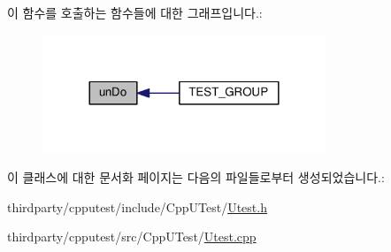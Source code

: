 이 함수를 호출하는 함수들에 대한 그래프입니다.\+:
\nopagebreak
\begin{figure}[H]
\begin{center}
\leavevmode
\includegraphics[width=240pt]{class_test_installer_a359934f74e0e64b27fedc6caab497747_icgraph}
\end{center}
\end{figure}




이 클래스에 대한 문서화 페이지는 다음의 파일들로부터 생성되었습니다.\+:\begin{DoxyCompactItemize}
\item 
thirdparty/cpputest/include/\+Cpp\+U\+Test/\hyperlink{_utest_8h}{Utest.\+h}\item 
thirdparty/cpputest/src/\+Cpp\+U\+Test/\hyperlink{_utest_8cpp}{Utest.\+cpp}\end{DoxyCompactItemize}
